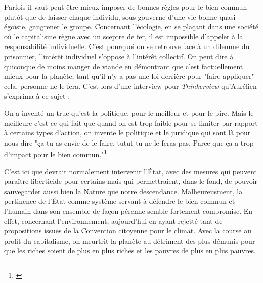 Parfois il vaut peut être mieux imposer de bonnes règles pour le bien commun plutôt que de laisser
chaque individu, sous gouverne d'une vie bonne quasi égoïste, gangrener le groupe. Concernant
l'écologie, en se plaçant dans une société où le capitalisme règne avec un sceptre de fer, il est
impossible d'appeler à la responsabilité individuelle. C'est pourquoi on se retrouve face à un
dilemme du prisonnier, l'intérêt individuel s'oppose à l'intérêt collectif. On peut dire à quiconque
de moins manger de viande en démontrant que c'est factuellement mieux pour la planète, tant qu'il
n'y a pas une loi derrière pour "faire appliquer" cela, personne ne le fera. C'est lors d'une
interview pour \textit{Thinkerview} qu'Aurélien \citeauthor{ThinkerviewBarrau} s'exprima à ce sujet
:

\begin{quoting}
    On a inventé un truc qu'est la politique, pour le meilleur et pour le pire. Mais le meilleure
    c'est ce qui fait que quand on est trop faible pour se limiter par rapport à certains types
    d'action, on invente le politique et le juridique qui sont là pour nous dire "ça tu as envie de
    le faire, tutut tu ne le feras pas. Parce que ça a trop d'impact pour le bien commun."\footnote{\cite{ThinkerviewBarrau} }
\end{quoting}

C'est ici que devrait normalement intervenir l'État, avec des mesures qui peuvent paraître
liberticide pour certains mais qui permettraient, dans le fond, de pouvoir sauvegarder aussi bien la
Nature que notre descendance. Malheureusment, la pertinence de l'État comme système servant à
défendre le bien commun et l'humain dans son ensemble de façon pérenne semble fortement compromise.
En effet, concernant l'environnement, aujourd'hui  en ayant rejetté tant de propositions issues
de la Convention citoyenne pour le climat. Avec la course au profit du capitalisme, on meurtrit la
planète au détriment des plus démunis pour que les riches soient de plus en plus riches et les
pauvres de plus en plus pauvres.